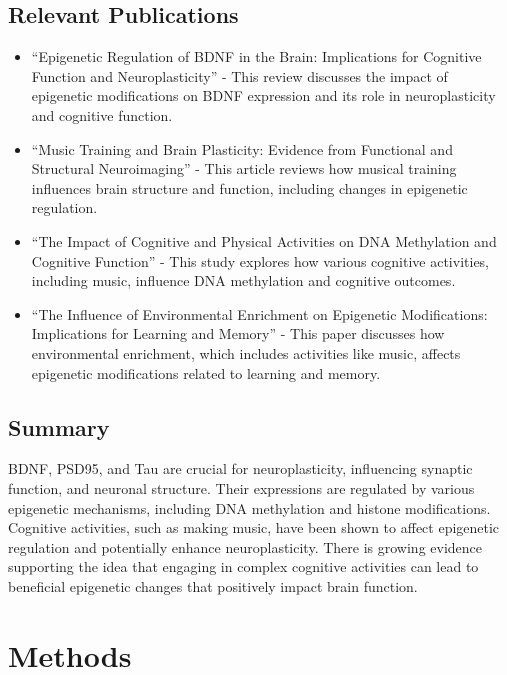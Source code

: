 \documentclass[
]{agujournal2019}
\providecommand{\tightlist}{%
  \setlength{\itemsep}{0pt}\setlength{\parskip}{0pt}}\usepackage{longtable,booktabs,array}
\begin{document}
\subsection{Relevant Publications}\label{relevant-publications}

\begin{itemize}
\tightlist
\item
  ``Epigenetic Regulation of BDNF in the Brain: Implications for
  Cognitive Function and Neuroplasticity'' - This review discusses the
  impact of epigenetic modifications on BDNF expression and its role in
  neuroplasticity and cognitive function.
\item
  ``Music Training and Brain Plasticity: Evidence from Functional and
  Structural Neuroimaging'' - This article reviews how musical training
  influences brain structure and function, including changes in
  epigenetic regulation.
\item
  ``The Impact of Cognitive and Physical Activities on DNA Methylation
  and Cognitive Function'' - This study explores how various cognitive
  activities, including music, influence DNA methylation and cognitive
  outcomes.
\item
  ``The Influence of Environmental Enrichment on Epigenetic
  Modifications: Implications for Learning and Memory'' - This paper
  discusses how environmental enrichment, which includes activities like
  music, affects epigenetic modifications related to learning and
  memory.
\end{itemize}

\subsection{Summary}\label{summary}

BDNF, PSD95, and Tau are crucial for neuroplasticity, influencing
synaptic function, and neuronal structure. Their expressions are
regulated by various epigenetic mechanisms, including DNA methylation
and histone modifications. Cognitive activities, such as making music,
have been shown to affect epigenetic regulation and potentially enhance
neuroplasticity. There is growing evidence supporting the idea that
engaging in complex cognitive activities can lead to beneficial
epigenetic changes that positively impact brain function.

\section{Methods}\label{sec-data-methods}
\end{document}
